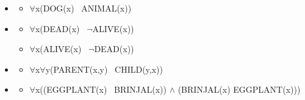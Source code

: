 \documentclass[headrule,footrule]{foils}
\begin{document}



\begin{itemize}
\item {}
  \begin{itemize}
  \item $\forall$x(DOG(x) \into\ ANIMAL(x))
  \end{itemize}
\item {}
  \begin{itemize}
  \item $\forall$x(DEAD(x) \into\ $\neg$ALIVE(x))
  \item $\forall$x(ALIVE(x) \into\ $\neg$DEAD(x))
  \end{itemize}
\item {}
  \begin{itemize}
  \item $\forall$x$\forall$y(PARENT(x,y) \into\ CHILD(y,x))
  \end{itemize}
\item {}
  \begin{itemize}
  \item $\forall$x((EGGPLANT(x) \into\ BRINJAL(x)) $\wedge$ 
    (BRINJAL(x) \into EGGPLANT(x)))
  \end{itemize}
\end{itemize}
\end{document}

